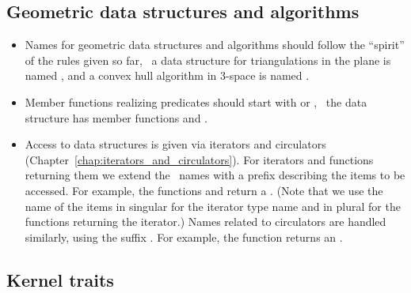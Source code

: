 \subsection*{Geometric data structures and algorithms}
\begin{itemize}
\item Names for geometric data structures and algorithms should follow
      the ``spirit'' of the rules given so far, \eg~a data structure for
      triangulations in the plane is named , and a
      convex hull algorithm in 3-space is named .
\item Member functions realizing predicates should start with  or
      , \eg~the data structure  has member
      functions  and .
\item Access to data structures is given via iterators and
      circulators (Chapter~\ref{chap:iterators_and_circulators}).
      For iterators and functions
      returning them we extend
      the \stl\ names with a prefix describing the items to be accessed.
      For example, the functions  and 
      return a . (Note that we use the name of the items
      in singular for the iterator type name and in plural for the functions
      returning the iterator.) Names related to circulators are handled
      similarly, using the suffix . For example, the
      function  returns an .
\end{itemize}


\subsection*{Kernel traits}

